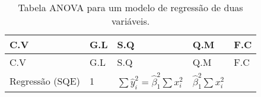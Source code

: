 \documentclass[
]{book}
\begin{document}
\begin{longtable}[]{@{}lllll@{}}
\caption{\label{tab:anovareg} Tabela ANOVA para um modelo de regressão de duas variáveis.}\tabularnewline
\toprule
\begin{minipage}[b]{0.17\columnwidth}\raggedright
C.V\strut
\end{minipage} & \begin{minipage}[b]{0.17\columnwidth}\raggedright
G.L\strut
\end{minipage} & \begin{minipage}[b]{0.17\columnwidth}\raggedright
S.Q\strut
\end{minipage} & \begin{minipage}[b]{0.17\columnwidth}\raggedright
Q.M\strut
\end{minipage} & \begin{minipage}[b]{0.17\columnwidth}\raggedright
F.C\strut
\end{minipage}\tabularnewline
\midrule
\endfirsthead
\toprule
\begin{minipage}[b]{0.17\columnwidth}\raggedright
C.V\strut
\end{minipage} & \begin{minipage}[b]{0.17\columnwidth}\raggedright
G.L\strut
\end{minipage} & \begin{minipage}[b]{0.17\columnwidth}\raggedright
S.Q\strut
\end{minipage} & \begin{minipage}[b]{0.17\columnwidth}\raggedright
Q.M\strut
\end{minipage} & \begin{minipage}[b]{0.17\columnwidth}\raggedright
F.C\strut
\end{minipage}\tabularnewline
\midrule
\endhead
\begin{minipage}[t]{0.17\columnwidth}\raggedright
Regressão (SQE)\strut
\end{minipage} & \begin{minipage}[t]{0.17\columnwidth}\raggedright
1\strut
\end{minipage} & \begin{minipage}[t]{0.17\columnwidth}\raggedright
\(\sum \hat{y}_i^2=\hat{\beta}_1^2 \sum x_i^2\)\strut
\end{minipage} & \begin{minipage}[t]{0.17\columnwidth}\raggedright
\(\hat{\beta}_1^2 \sum x_i^2\)\strut
\end{minipage} & \begin{minipage}[t]{0.17\columnwidth}\raggedright

\end{minipage}
\end{longtable}
\end{document}
